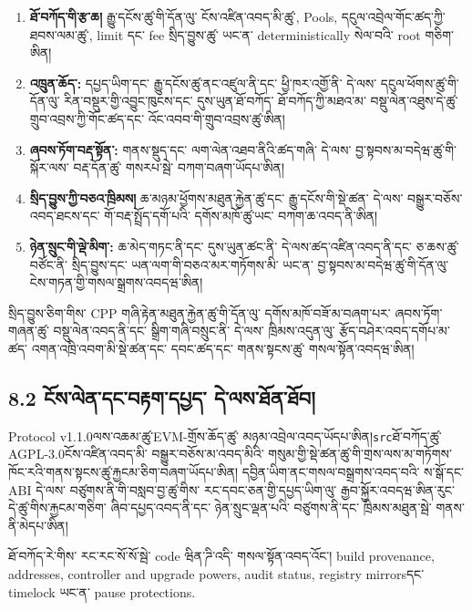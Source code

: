 \documentclass[11pt]{article}
\begin{document}
\begin{enumerate}[leftmargin=*]
\item \textbf{ཐོ་བཀོད་གི་རྩ་ཆ།} རྒྱུ་དངོས་ཚུ་གི་དོན་ལུ་ ངོས་འཛིན་འབད་མི་ཚུ་, Pools, དངུལ་འབྲེལ་གོང་ཚད་ཀྱི་ ཐབས་ལམ་ཚུ་, limit དང་ fee སྲིད་བྱུས་ཚུ་ ཡང་ན་ deterministically སེལ་བའི་ root གཅིག་ཨིན།
\item \textbf{འཁྲུན་ཆོད་:} དཔྱད་ཡིག་དང་ རྒྱུ་དངོས་ཚུ་ནང་འཛུལ་ནི་དང་ ཕྱི་ཁར་འགྱོ་ནི་ དེ་ལས་ དངུལ་ཕོགས་ཚུ་གི་དོན་ལུ་ རིན་བསྡུར་གྱི་འབྱུང་ཁུངས་དང་ དུས་ཡུན་ཐོ་བཀོད་ ཐོ་བཀོད་ཀྱི་མཐའ་མ་ བསྡུ་ལེན་འཐུས་དེ་ཚུ་ གྲུབ་འབྲས་ཀྱི་གོང་ཚད་དང་ འོང་འབབ་གི་གྲུབ་འབྲས་ཚུ་ཨིན།
\item \textbf{ཞབས་ཏོག་བརྡ་སྟོན་:} གནས་སྡུད་དང་ ལག་ལེན་འཐབ་ནིའི་ཚད་གཞི་ དེ་ལས་ བྱ་སྟབས་མ་བདེཝ་ཚུ་གི་སྐོར་ལས་ བརྡ་དོན་ཚུ་ གསརཔ་སྦེ་ བཀག་བཞག་ཡོདཔ་ཨིན།
\item \textbf{སྲིད་བྱུས་ཀྱི་བཅའ་ཁྲིམས།} ཆ་མཉམ་ཕྱོགས་མཐུན་རྐྱེན་ཚུ་དང་ རྒྱུ་དངོས་གི་སྡེ་ཚན་ དེ་ལས་ བསྒྱུར་བཅོས་འབད་ཐངས་དང་ གོ་བརྡ་སྤྲོད་དགོ་པའི་ དགོས་མཁོ་ཚུ་ཡང་ བཀག་ཆ་འབད་ནི་ཨིན།
\item \textbf{ཉེན་སྲུང་གི་ལྡེ་མིག་:} ཆ་མེད་གཏང་ནི་དང་ དུས་ཡུན་ཚང་ནི་ དེ་ལས་ཚད་འཛིན་འབད་ནི་དང་ ཅ་ཆས་ཚུ་བཙོང་ནི་ སྲིད་བྱུས་དང་ ཡན་ལག་གི་བཅའ་མར་གཏོགས་མི་ ཡང་ན་ བྱ་སྟབས་མ་བདེཝ་ཚུ་གི་དོན་ལུ་ ངེས་གཏན་གྱི་གསལ་སྒྲགས་འབདཝ་ཨིན།
\end{enumerate}
སྲིད་བྱུས་ཅིག་གིས་ CPP གཞི་རྟེན་མཐུན་རྐྱེན་ཚུ་གི་དོན་ལུ་ དགོས་མཁོ་བཟོ་མ་བཞག་པར་ ཞབས་ཏོག་གཞན་ཚུ་ བསྡུ་ལེན་འབད་ནི་དང་ སྒྲིག་གཞི་བསྲུང་ནི་ དེ་ལས་ ཁྲིམས་འདུན་ལུ་ རྩོད་བཤེར་འབད་དགོཔ་མ་ཚད་ འགན་འཁྲི་འབག་མི་སྡེ་ཚན་དང་ དབང་ཚད་དང་ གནས་སྟངས་ཚུ་ གསལ་སྟོན་འབདཝ་ཨིན།

\subsection*{8.2 ངོས་ལེན་དང་བརྟག་དཔྱད་ དེ་ལས་ཐོན་ཐོབ།}

Protocol v1.1.0ལས་འཆམ་ཚུ་EVM-གྲོས་ཆོད་ཚུ་ མཉམ་འབྲེལ་འབད་ཡོདཔ་ཨིན།\texttt{src}ཐོ་བཀོད་ཚུ་AGPL-3.0ངོས་འཛིན་འབད་མི་ བསྒྱུར་བཅོས་མ་འབད་མིའི་ གསུམ་གྱི་སྡེ་ཚན་ཚུ་གི་གྲས་ལས་མ་གཏོགས་ ཁོང་རའི་གནས་སྟངས་ཚུ་རྐྱངམ་ཅིག་བཞག་ཡོདཔ་ཨིན། དབྱིན་ཡིག་ནང་གསལ་བསྒྲགས་འབད་བའི་ ས་སྒོ་དང་ ABI དེ་ལས་ བཙུགས་ནི་གི་བསླབ་བྱ་ཚུ་གིས་ རང་དབང་ཅན་གྱི་དཔྱད་ཡིག་ལུ་ རྒྱབ་སྐྱོར་འབདཝ་ཨིན་རུང་ དེ་ཚུ་གིས་རྐྱངམ་གཅིག་ ཞིབ་དཔྱད་འབད་ནི་དང་ ཉེན་སྲུང་ལྡན་པའི་ བཙུགས་ནི་དང་ ཁྲིམས་མཐུན་སྦེ་ གནས་ནི་མེདཔ་ཨིན།

ཐོ་བཀོད་རེ་གིས་ རང་རང་སོ་སོ་སྦེ་ code ཝིན་ཌི་འདི་ གསལ་སྟོན་འབད་འོང་། build provenance, addresses, controller and upgrade powers, audit status, registry mirrorsདང་ timelock ཡང་ན་ pause protections.
\end{document}
